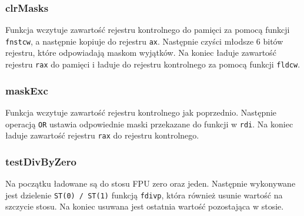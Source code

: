 \documentclass[polish, 11pt]{article}
\begin{document}
		\subsubsection{clrMasks}
			\begin{minipage}{.5\textwidth}
				Funkcja wczytuje zawartość rejestru kontrolnego do pamięci
				za pomocą funkcji \verb|fnstcw|, a następnie kopiuje do rejestru \verb|ax|.
				Następnie czyści młodsze 6 bitów rejestru, które odpowiadają maskom wyjątków.
				Na koniec ładuje zawartość rejestru \verb|rax| do pamięci
				i ładuje do rejestru kontrolnego za pomocą funkcji \verb|fldcw|.
			\end{minipage}%
			\hspace{1cm}
			\begin{minipage}{.5\textwidth}
				
			\end{minipage}

		\subsubsection{maskExc}
			\begin{minipage}{.5\textwidth}
				Funkcja wczytuje zawartość rejestru kontrolnego jak poprzednio.
				Następnie operacją \verb|OR| ustawia odpowiednie maski przekazane do funkcji w \verb|rdi|.
				Na koniec ładuje zawartość rejestru \verb|rax| do rejestru kontrolnego.
			\end{minipage}%
			\hspace{1cm}
			\begin{minipage}{.5\textwidth}
				
			\end{minipage}

		\subsubsection{testDivByZero}
			\begin{minipage}{.5\textwidth}
				Na początku ładowane są do stosu FPU zero oraz jeden.
				Następnie wykonywane jest dzielenie \verb|ST(0) / ST(1)|
				funkcją \verb|fdivp|, która również usunie wartość na szczycie stosu.
				Na koniec usuwana jest ostatnia wartość pozostająca w stosie.
			\end{minipage}%
			\hspace{1cm}
			\begin{minipage}{.5\textwidth}
				
			\end{minipage}
\end{document}
